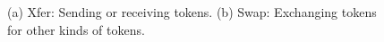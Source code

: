 
\begin{figure}[t]
    \centering
    \caption{(a) Xfer: Sending or receiving tokens.
    (b) Swap: Exchanging tokens for other kinds of tokens. 
    }
\end{figure}

